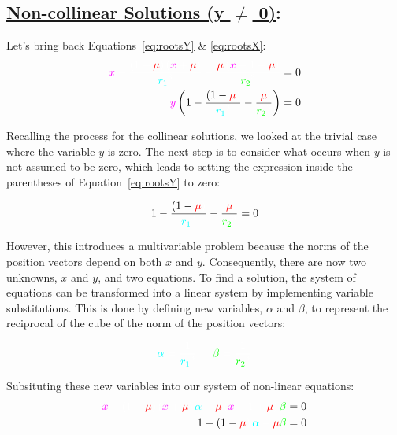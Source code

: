\subsection*{\underline{Non-collinear Solutions (y $\neq$ 0)}:}

Let's bring back Equations~\eqref{eq:rootsY} \& \eqref{eq:rootsX}:
\begin{align*}
    \cm x \cw - \ddfrac{\left(1 - \cred \mu \cw \right) \left(\cm x \cw + \cred \mu \cw\right)}{\cc r_1 \cw ^3} - \ddfrac{\cred \mu \cw \left(\cm x \cw - 1 + \cred\mu\cw\right)}{\cg r_2 \cw ^3} &= 0
    \\
    \textcolor{magenta}{y} \left( 1 - \ddfrac{\left(1-\cred\mu\cw\right)}{\cc r_1 \cw ^3} - \ddfrac{\cred\mu\cw}{\cg r_2 \cw ^3} \right) &= 0
\end{align*}


Recalling the process for the collinear solutions, we looked at the trivial case where the variable $y$ is zero. The next step is to consider what occurs when $y$ is not assumed to be zero, which leads to setting the expression inside the parentheses of Equation~\eqref{eq:rootsY} to zero:

\begin{equation*}
    1 - \ddfrac{\left(1-\cred\mu\cw\right)}{\cc r_1 \cw ^3} - \ddfrac{\cred\mu\cw}{\cg r_2 \cw ^3} = 0 \\
\end{equation*}

However, this introduces a multivariable problem because the norms of the position vectors depend on both $x$ and $y$. Consequently, there are now two unknowns, $x$ and $y$, and two equations. To find a solution, the system of equations can be transformed into a linear system by implementing variable substitutions. This is done by defining new variables, $\alpha$ and $\beta$, to represent the reciprocal of the cube of the norm of the position vectors:

\begin{equation*}
    \cc \alpha \cw = \ddfrac{1}{\cc r_1 \cw ^3}, \quad \cg \beta \cw = \ddfrac{1}{\cg r_2 \cw ^3}
\end{equation*}

Subsituting these new variables into our system of non-linear equations:
\begin{align*}
    \cm x \cw - \left(1 - \cred \mu \cw \right) \left(\cm x \cw + \cred \mu \cw\right) \cc \alpha \cw 
    - \cred \mu \cw \left(\cm x \cw - 1 + \cred\mu\cw\right) \cg \beta \cw &= 0
    \\
    1 - \left(1-\cred\mu\cw\right) \cc \alpha \cw - \cred\mu\cw \cg \beta \cw &= 0
\end{align*}


